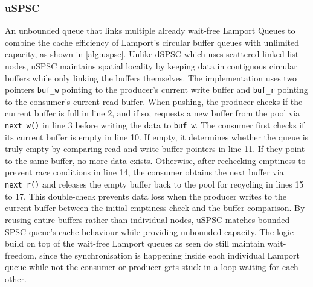 \subsubsection{\acf{uSPSC}}
An unbounded queue that links multiple already wait-free Lamport Queues to combine the cache efficiency of Lamport's circular buffer queues with unlimited capacity, as shown in \cref{alg:uspsc}. Unlike \ac{dSPSC} which uses scattered linked list nodes, uSPSC maintains spatial locality by keeping data in contiguous circular buffers while only linking the buffers themselves. The implementation uses two pointers \texttt{buf\_w} pointing to the producer's current write buffer and \texttt{buf\_r} pointing to the consumer's current read buffer. When pushing, the producer checks if the current buffer is full in line 2, and if so, requests a new buffer from the pool via \texttt{next\_w()} in line 3 before writing the data to \texttt{buf\_w}. The consumer first checks if its current buffer is empty in line 10. If empty, it determines whether the queue is truly empty by comparing read and write buffer pointers in line 11. If they point to the same buffer, no more data exists. Otherwise, after rechecking emptiness to prevent race conditions in line 14, the consumer obtains the next buffer via \texttt{next\_r()} and releases the empty buffer back to the pool for recycling in lines 15 to 17. This double-check prevents data loss when the producer writes to the current buffer between the initial emptiness check and the buffer comparison. By reusing entire buffers rather than individual nodes, \ac{uSPSC} matches bounded \ac{SPSC} queue's cache behaviour while providing unbounded capacity. The logic build on top of the wait-free Lamport queues as seen do still maintain wait-freedom, since the synchronisation is happening inside each individual Lamport queue while not the consumer or producer gets stuck in a loop waiting for each other. \cite{torquati2010singleproducersingleconsumerqueuessharedcache}

